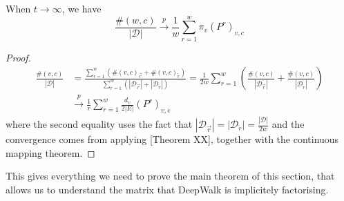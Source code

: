 \documentclass[a4paper]{article}
\newcommand{\D}{\mathcal D}
\newcommand{\rar}{\overrightarrow r}
\newcommand{\lar}{\overleftarrow r}
\begin{document}
\begin{lemma}
  When $t \to \infty$, we have
  \[\frac{\#(w, c)}{|\D|} \overset{p}{\to} \frac{1}{w} \sum_{r = 1}^w \pi_v
    (P^r)_{v,c}\]
\end{lemma}
\begin{proof}
  \begin{align}
    \frac{\#(v, c)}{|\D|} &=  \frac{\sum_{r=1}^w (\#(v, c)_{\rar} + \#(v, c)_{\lar})}{\sum_{r=1}^w (|\D_{\rar}| + |\D_{\lar}|)} = \frac{1}{2w} \sum_{r=1}^w \left( \frac{\#(v, c)}{|\D_{\rar}|} + \frac{\#(v, c)}{|\D_{\lar}|} \right)\\
    &\overset{p}{\to} \frac{1}{r}\sum_{r=1}^{w} \frac{d_v}{2|E|}(P^r)_{v, c}
  \end{align}
  where the second equality uses the fact that $|\D_{\rar}| = |\D_{\lar}| =
  \frac{|\D|}{2w}$ and the convergence comes from applying [Theorem XX],
  together with the continuous mapping theorem.
\end{proof}

This gives everything we need to prove the main theorem of this section, that
allows us to understand the matrix that DeepWalk is implicitely factorising.

\MainDeepWalk*
\end{document}
